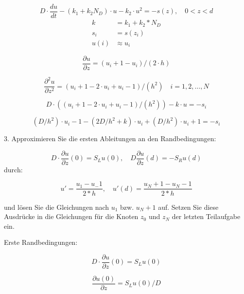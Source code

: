 \begin{equation}
	D\cdot \frac{du}{dt} -\left( k_1 +k_2 N_D\right)\cdot u-k_2\cdot u^2=-s(z), \quad 0 <z<d
\end{equation}\label{eq:stationDGL}
\begin{align*}
	k&=k_1+k_2*N_D\\
	s_i&=s(z_i)\\
	u(i)&\approx u_i
\end{align*}

\begin{equation}
	\frac{\partial u}{\partial z} = (u_i+1 - u_i)/(2\cdot h)
\end{equation}

\begin{equation}
	\frac{\partial ^2 u }{\partial z^2} = (u_i+1 - 2\cdot u_i + u_i-1)/(h^2) \quad i=1,2,\dots,N
\end{equation}

\begin{equation}
	D\cdot ((u_i+1 - 2\cdot u_i + u_i-1)/(h^2)) -k\cdot u = -s_i
\end{equation}

\begin{equation}
	(D/h^2)\cdot u_i-1 - (2D/h^2+k)\cdot u_i + (D/h^2)\cdot u_i+1 = -s_i
\end{equation}

3. Approximieren Sie die ersten Ableitungen an den Randbedingungen:

\begin{equation}
	D\cdot \frac{\partial u}{\partial z}(0)=S_Lu(0),\quad D\frac{\partial u}{\partial z}(d)=-S_Ru(d)
\end{equation}
durch:

\begin{equation}
	u' = \frac{u_1-u_-1}{2*h}, \quad u'(d) = \frac{u_N+1-u_N-1}{2*h}
\end{equation}

und lösen Sie die Gleichungen nach $u_1$ bzw. $u_N+1$ auf. Setzen Sie diese Ausdrücke in die Gleichungen für die Knoten $z_0$ und $z_N$ der letzten Teilaufgabe ein.

Erste Randbedingungen:

\begin{equation}
	D\cdot \frac{\partial u}{\partial z}(0)=S_Lu(0)
\end{equation}

\begin{equation}
	\frac{\partial u(0)}{\partial z}=S_Lu(0)/D	
\end{equation}

